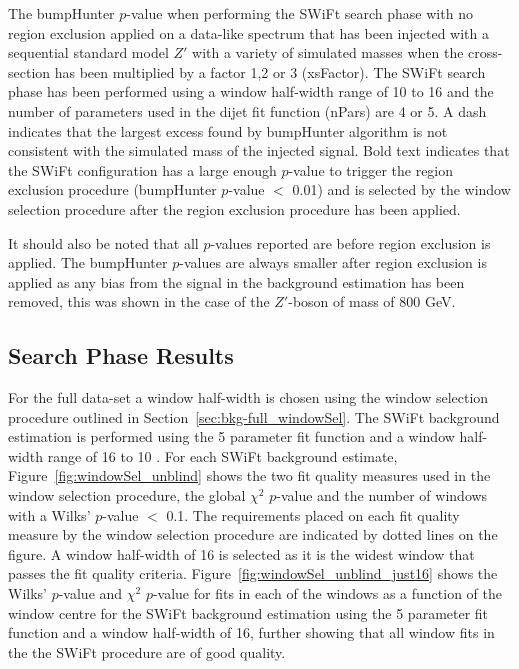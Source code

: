 \begin{table}[!ht]
\caption{\label{tab:bumpH_lm_sigInj}
  The  bumpHunter \mbox{$p$-value} when performing the SWiFt search phase with no region exclusion applied
  on a data-like spectrum that has been injected with a sequential standard model $Z'$ with
  a variety of simulated masses when the cross-section has been multiplied by a factor 1,2 or 3 (xsFactor).
  The SWiFt search phase has been performed using a window half-width range of 10 to 16
  and the number of parameters used in the dijet fit function (nPars) are 4 or 5.
  A dash indicates that the largest excess found by bumpHunter algorithm is not consistent with the simulated mass of the injected signal.
  Bold text indicates that the SWiFt configuration has a large enough $p$-value to trigger the region exclusion procedure (bumpHunter $p$-value $<$ 0.01)
  and is selected by the window selection procedure after the region exclusion procedure has been applied. }
\end{table}

It should also be noted that all $p$-values reported are before region exclusion is applied.
The bumpHunter \mbox{$p$-value}s are always smaller after region exclusion is applied
as any bias from the signal in the background estimation has been removed,
this was shown in the case of the $Z'$-boson of mass of 800 GeV.


\newpage
\subsection{Search Phase Results}
\label{sec:bkg-full_results}

For the full \lm{} data-set a window half-width is chosen using the window selection procedure outlined in Section~\ref{sec:bkg-full_windowSel}.
The SWiFt background estimation is performed using the 5 parameter fit function and a window half-width range of 16 to 10 .
For each SWiFt background estimate, Figure~\ref{fig:windowSel_unblind} shows the two fit quality measures used in the window selection procedure,
the global $\chi^2$ $p$-value and the number of windows with a Wilks' $p$-value $<$ 0.1.
The requirements placed on each fit quality measure by the window selection procedure are indicated by dotted lines on the figure.
A window half-width of 16 is selected as it is the widest window that passes the fit quality criteria.
Figure~\ref{fig:windowSel_unblind_just16} shows the Wilks' $p$-value and $\chi^2$ $p$-value for fits in each of the windows
as a function of the window centre for the SWiFt background estimation using the 5 parameter fit function and a window half-width of 16,
further showing that all window fits in the the SWiFt procedure are of good quality.

